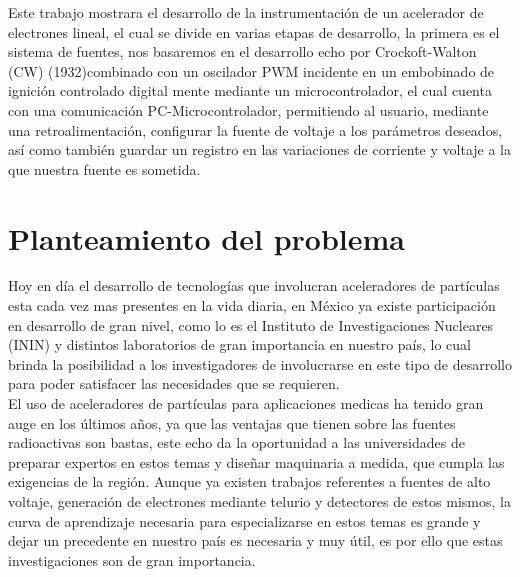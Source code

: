 Este trabajo mostrara el desarrollo de la instrumentación de un acelerador de electrones lineal, el cual se divide en varias etapas de desarrollo, la primera es el sistema de fuentes, nos basaremos en el desarrollo echo por Crockoft-Walton (CW) (1932)combinado con un oscilador PWM incidente en un embobinado de ignición controlado digital mente mediante un microcontrolador, el cual cuenta con una comunicación PC-Microcontrolador, permitiendo al usuario, mediante una retroalimentación, configurar la fuente de voltaje a los parámetros deseados, así como también guardar un registro en las variaciones de corriente y voltaje a la que nuestra fuente es sometida. \\


\section{Planteamiento del problema}
Hoy en día el desarrollo de tecnologías que involucran aceleradores de partículas esta
cada vez mas presentes en la vida diaria, en México ya existe participación en desarrollo
de gran nivel, como lo es el Instituto de Investigaciones Nucleares (ININ) y distintos
laboratorios de gran importancia en nuestro país, lo cual brinda la posibilidad a los investigadores
de involucrarse en este tipo de desarrollo para poder satisfacer las necesidades
que se requieren.\\

El uso de aceleradores de partículas para aplicaciones medicas ha tenido gran auge en
los últimos años, ya que las ventajas que tienen sobre las fuentes radioactivas son bastas,
este echo da la oportunidad a las universidades de preparar expertos en estos temas y
diseñar maquinaria a medida, que cumpla las exigencias de la región. Aunque ya existen
trabajos referentes a fuentes de alto voltaje, generación de electrones mediante telurio y
detectores de estos mismos, la curva de aprendizaje necesaria para especializarse en estos
temas es grande y dejar un precedente en nuestro país es necesaria y muy útil, es por ello que estas
investigaciones son de gran importancia.
